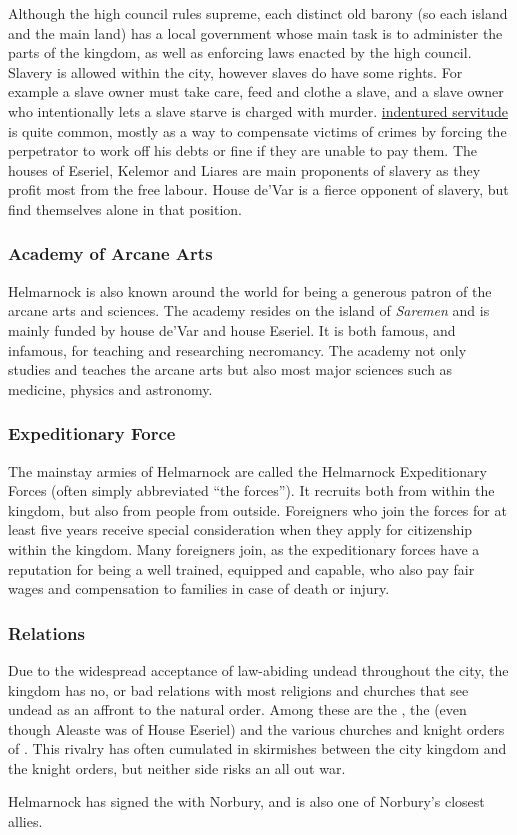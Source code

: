 Although the high council rules supreme, each distinct old barony (so each
island and the main land) has a local government whose main task is to
administer the parts of the kingdom, as well as enforcing laws enacted by the
high council. Slavery is allowed within the city, however slaves do have
some rights. For example a slave owner must take care, feed and clothe a
slave, and a slave owner who intentionally lets a slave starve is charged with
murder. \hyperref[sec:Indentured Servitude]{indentured servitude} is quite
common, mostly as a way to compensate victims of crimes by forcing the
perpetrator to work off his debts or fine if they are unable to pay them. The
houses of Eseriel, Kelemor and Liares are main proponents of slavery as they
profit most from the free labour. House de'Var is a fierce opponent of
slavery, but find themselves alone in that position.

\subsubsection{Academy of Arcane Arts}

Helmarnock is also known around the world for being a generous patron of the
arcane arts and sciences. The academy resides on the island of \emph{Saremen}
and is mainly funded by house de'Var and house Eseriel. It is both famous,
and infamous, for teaching and researching necromancy. The academy not only
studies and teaches the arcane arts but also most major sciences such as
medicine, physics and astronomy.

\subsubsection{Expeditionary Force}
\label{sec:Expeditionary Force}

The mainstay armies of Helmarnock are called the Helmarnock Expeditionary
Forces (often simply abbreviated ``the forces''). It recruits both from within
the kingdom, but also from people from outside. Foreigners who join the forces
for at least five years receive special consideration when they apply for
citizenship within the kingdom. Many foreigners join, as the expeditionary
forces have a reputation for being a well trained, equipped and capable, who
also pay fair wages and compensation to families in case of death or injury.

\subsubsection{Relations}

Due to the widespread acceptance of law-abiding undead throughout the city,
the kingdom has no, or bad relations with most religions and churches that see
undead as an affront to the natural order. Among these are the
, the  (even
though Aleaste was of House Eseriel) and the various churches and knight
orders of . This rivalry has often cumulated in skirmishes
between the city kingdom and the knight orders, but neither side risks an all
out war.

Helmarnock has signed the  with Norbury, and is also
one of Norbury's closest allies.
